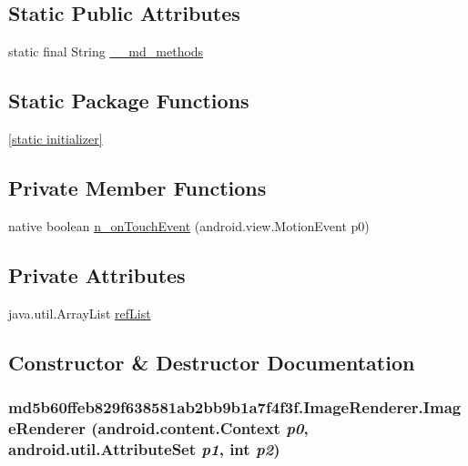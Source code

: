 \subsection*{Static Public Attributes}
\begin{CompactItemize}
\item 
static final String \hyperlink{classmd5b60ffeb829f638581ab2bb9b1a7f4f3f_1_1_image_renderer_270ae274b970d099f33432d32109ce8b}{\_\-\_\-md\_\-methods}
\end{CompactItemize}
\subsection*{Static Package Functions}
\begin{CompactItemize}
\item 
\hyperlink{classmd5b60ffeb829f638581ab2bb9b1a7f4f3f_1_1_image_renderer_6be205050fb3dc45d4497cae1eb7831a}{\mbox{[}static initializer\mbox{]}}
\end{CompactItemize}
\subsection*{Private Member Functions}
\begin{CompactItemize}
\item 
native boolean \hyperlink{classmd5b60ffeb829f638581ab2bb9b1a7f4f3f_1_1_image_renderer_68e0694015ee10a62b53a937e6a39a97}{n\_\-onTouchEvent} (android.view.MotionEvent p0)
\end{CompactItemize}
\subsection*{Private Attributes}
\begin{CompactItemize}
\item 
java.util.ArrayList \hyperlink{classmd5b60ffeb829f638581ab2bb9b1a7f4f3f_1_1_image_renderer_1489fe181115bffda1ea70a17aeeaedc}{refList}
\end{CompactItemize}


\subsection{Constructor \& Destructor Documentation}
\hypertarget{classmd5b60ffeb829f638581ab2bb9b1a7f4f3f_1_1_image_renderer_c24ca6c41669583419378dbb5e462a2e}{
\subsubsection[{ImageRenderer}]{\setlength{\rightskip}{0pt plus 5cm}md5b60ffeb829f638581ab2bb9b1a7f4f3f.ImageRenderer.ImageRenderer (android.content.Context {\em p0}, \/  android.util.AttributeSet {\em p1}, \/  int {\em p2})}}
\label{classmd5b60ffeb829f638581ab2bb9b1a7f4f3f_1_1_image_renderer_c24ca6c41669583419378dbb5e462a2e}


